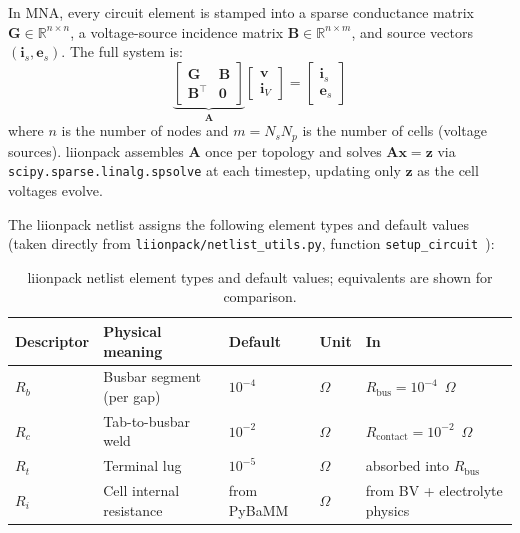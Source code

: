 In MNA, every circuit element is stamped into a sparse conductance matrix $\mathbf{G} \in \mathbb{R}^{n \times n}$, a voltage-source incidence matrix $\mathbf{B} \in \mathbb{R}^{n \times m}$, and source vectors $(\mathbf{i}_s, \mathbf{e}_s)$. The full system is:
\begin{equation}
  \underbrace{\begin{bmatrix} \mathbf{G} & \mathbf{B} \\ \mathbf{B}^\top & \mathbf{0} \end{bmatrix}}_{\mathbf{A}}
  \begin{bmatrix} \mathbf{v} \\ \mathbf{i}_V \end{bmatrix}
  =
  \begin{bmatrix} \mathbf{i}_s \\ \mathbf{e}_s \end{bmatrix}
  \label{eq:mna_system}
\end{equation}
where $n$ is the number of nodes and $m = N_s N_p$ is the number of cells (voltage sources). liionpack assembles $\mathbf{A}$ once per topology and solves $\mathbf{A}\mathbf{x} = \mathbf{z}$ via \texttt{scipy.sparse.linalg.spsolve} at each timestep, updating only $\mathbf{z}$ as the cell voltages evolve.

The liionpack netlist assigns the following element types and default values (taken directly from \texttt{liionpack/netlist\_utils.py}, function \texttt{setup\_circuit}~\cite{Tranter2022}):

\begin{table}[H]
\centering
\caption{liionpack netlist element types and default values; \VIBE{} equivalents are shown for comparison.}
\label{tab:liionpack_resistances}
\begin{tabular}{lllll}
\toprule
\textbf{Descriptor} & \textbf{Physical meaning} & \textbf{Default} & \textbf{Unit} & \textbf{In \VIBE{}} \\
\midrule
$R_b$  & Busbar segment (per gap)   & $10^{-4}$ & $\Omega$ & $R_\text{bus}=10^{-4}$~$\Omega$ \\
$R_c$  & Tab-to-busbar weld         & $10^{-2}$ & $\Omega$ & $R_\text{contact}=10^{-2}$~$\Omega$ \\
$R_t$  & Terminal lug               & $10^{-5}$ & $\Omega$ & absorbed into $R_\text{bus}$ \\
$R_i$  & Cell internal resistance   & from PyBaMM & $\Omega$ & from BV + electrolyte physics \\
\bottomrule
\end{tabular}
\end{table}

